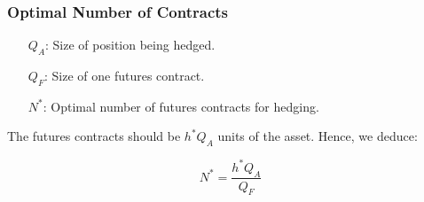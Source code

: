 \subsubsection*{Optimal Number of Contracts}
\bigskip

\begin{definition}
    \hphantom{Define:}
    \begin{enumerate}
        \item[\(Q_{A}\):] Size of position being hedged.
        \item[\(Q_{F}\):] Size of one futures contract.
        \item[ \(N^{*}\):] Optimal number of futures contracts for hedging.
    \end{enumerate}
\end{definition}

The futures contracts should be \(h^{*}Q_{A}\) units of the asset. Hence, we deduce:

\begin{equation}\label{eq:3}
    N^{*} = \frac{h^{*}Q_{A}}{Q_{F}}
\end{equation}

